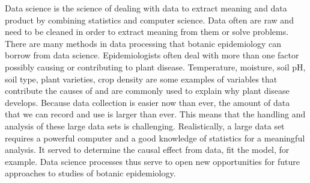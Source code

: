 \documentclass[12pt,a4paper]{article}
\begin{document}


Data science is the science of dealing with data to extract meaning and data product by combining statistics and computer science. Data often are raw and need to be cleaned in order to extract meaning from them or solve problems. There are many methods in data processing that botanic epidemiology can borrow from data science. Epidemiologists often deal with more than one factor possibly causing or contributing to plant disease. Temperature, moisture, soil pH, soil type, plant varieties, crop density are some examples of variables that contribute the causes of and are commonly used to explain why plant disease develops. Because data collection is easier now than ever, the amount of data that we can record and use is larger than ever. This means that the handling and analysis of these large data sets is challenging. Realistically, a large data set requires a powerful computer and a good knowledge of statistics for a meaningful analysis. It served to determine the causal effect from data, fit the model, for example. Data science processes thus serve to open new opportunities for future approaches to studies of botanic epidemiology.

\end{document}

